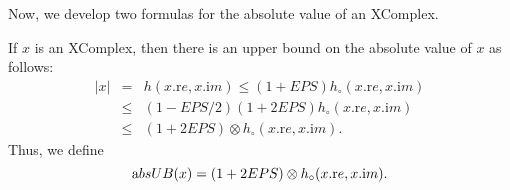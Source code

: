 Now, we develop two formulas for the absolute value of an XComplex.
 

\begin{definition} \label{GMT 7.0}
If $x$ is an XComplex, then
there is an upper bound on the absolute value of $x$ as follows:
\begin{eqnarray*}
|x| &=& h(x.{\mathrm re},x.{\mathrm im}) \le (1 + EPS) h_{\circ} (x.{\mathrm re},x.{\mathrm im})\\
&\le& (1 - EPS/2) (1 + 2EPS)h_{\circ} (x.{\mathrm re},x.{\mathrm im}) \\
&\le& (1 + 2EPS) \otimes h_{\circ} (x.{\mathrm re},x.{\mathrm im}).
\end{eqnarray*}
Thus, we define 
$${\textrm absUB}(x) = (1 + 2EPS) \otimes h_{\circ} (x.{\mathrm re},x.{\mathrm im}).$$ 
\end{definition}

